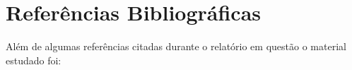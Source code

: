 \documentclass{article}
\begin{document}

     

\section{Referências Bibliográficas}
    Além de algumas referências citadas durante o relatório em questão o material estudado foi:\\
    
\end{document}
